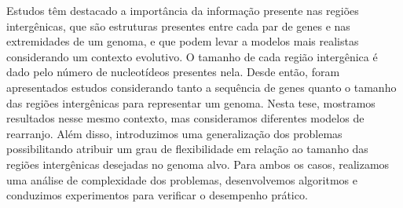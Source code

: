 \documentclass[Portugues,Final]{ic-tese-v3}
\theoremstyle{definition}
\theoremstyle{remark}
\theoremstyle{definition}
\begin{document}
\begin{resumo}
Estudos têm destacado a importância da informação presente nas regiões intergênicas, que são estruturas presentes entre cada par de genes e nas extremidades de um genoma, e que podem levar a modelos mais realistas considerando um contexto evolutivo. O tamanho de cada região intergênica é dado pelo número de nucleotídeos presentes nela. Desde então, foram apresentados estudos considerando tanto a sequência de genes quanto o tamanho das regiões intergênicas para representar um genoma. Nesta tese, mostramos resultados nesse mesmo contexto, mas consideramos diferentes modelos de rearranjo. Além disso, introduzimos uma generalização dos problemas possibilitando atribuir um grau de flexibilidade em relação ao tamanho das regiões intergênicas desejadas no genoma alvo. Para ambos os casos, realizamos uma análise de complexidade dos problemas, desenvolvemos algoritmos e conduzimos experimentos para verificar o desempenho prático. 
\end{resumo}
\end{document}
